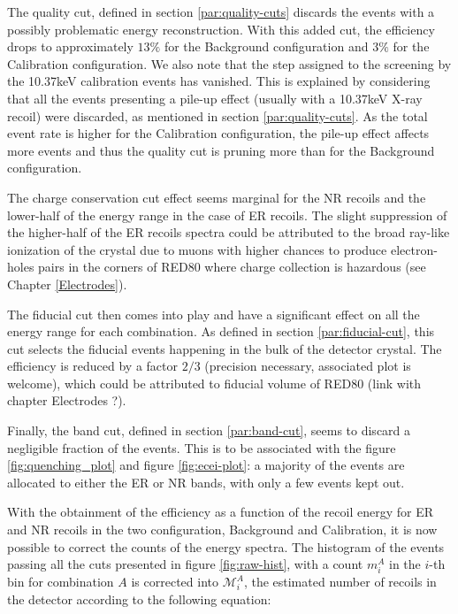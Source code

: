 The quality cut, defined in section \ref{par:quality-cuts} discards the events with a possibly problematic energy reconstruction. With this added cut, the efficiency drops to approximately $13\%$ for the Background configuration and $3\%$ for the Calibration configuration. We also note that the step assigned to the screening by the 10.37keV calibration events has vanished. This is explained by considering that all the events presenting a pile-up effect (usually with a 10.37keV X-ray recoil) were discarded, as mentioned in section \ref{par:quality-cuts}. As the total event rate is higher for the Calibration configuration, the pile-up effect affects more events and thus the quality cut is pruning more than for the Background configuration.

The charge conservation cut effect seems marginal for the NR recoils and the lower-half of the energy range in the case of ER recoils. The slight suppression of the higher-half of the ER recoils spectra could be attributed to the broad ray-like ionization of the crystal due to muons with higher chances to produce electron-holes pairs in the corners of RED80 where charge collection is hazardous (see Chapter \ref{Electrodes}).

The fiducial cut then comes into play and have a significant effect on all the energy range for each combination. As defined in section \ref{par:fiducial-cut}, this cut selects the fiducial events happening in the bulk of the detector crystal. The efficiency is reduced by a factor $2/3$ (precision necessary, associated plot is welcome), which could be attributed to fiducial volume of RED80 (link with chapter Electrodes ?).

Finally, the band cut, defined in section \ref{par:band-cut}, seems to discard a negligible fraction of the events. This is to be associated with the figure \ref{fig:quenching_plot} and figure \ref{fig:ecei-plot}: a majority of the events are allocated to either the ER or NR bands, with only a few events kept out.

With the obtainment of the efficiency as a function of the recoil energy for ER and NR recoils in the two configuration, Background and Calibration, it is now possible to correct the counts of the energy spectra.
The histogram of the events passing all the cuts presented in figure \ref{fig:raw-hist}, with a count $m_{i}^{A}$ in the $i$-th bin for combination $A$ is corrected into $\mathcal{M}_{i}^{A}$, the estimated number of recoils in the detector according to the following equation:

